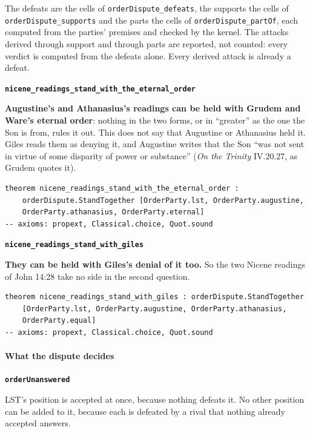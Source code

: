 \documentclass[11pt,paper=\testimonypaper,DIV=13,parskip=false]{scrartcl}
\begin{document}
\noindent The defeats are the cells of \texttt{order\allowbreak{}Dispute\_\allowbreak{}defeats}, the supports the cells of \texttt{order\allowbreak{}Dispute\_\allowbreak{}supports} and the parts the cells of \texttt{order\allowbreak{}Dispute\_\allowbreak{}part\allowbreak{}Of}, each computed from the parties' premises and checked by the kernel. The attacks derived through support and through parts are reported, not counted: every verdict is computed from the defeats alone. Every derived attack is already a defeat.
\par\medskip\noindent\textbf{\texttt{nicene\_\allowbreak{}readings\_\allowbreak{}stand\_\allowbreak{}with\_\allowbreak{}the\_\allowbreak{}eternal\_\allowbreak{}order}}\par\nobreak\noindent
\textbf{Augustine’s and Athanasius’s readings can be held with Grudem and Ware’s eternal order}: nothing in the two forms, or in “greater” as the one the Son is from, rules it out. This does not say that Augustine or Athanasius held it. Giles reads them as denying it, and Augustine writes that the Son “was not sent in virtue of some disparity of power or substance” (\emph{On the Trinity} IV.20.27, as Grudem quotes it).

{\small\begin{verbatim}
theorem nicene_readings_stand_with_the_eternal_order :
    orderDispute.StandTogether [OrderParty.lst, OrderParty.augustine,
    OrderParty.athanasius, OrderParty.eternal]
-- axioms: propext, Classical.choice, Quot.sound
\end{verbatim}}
\par\medskip\noindent\textbf{\texttt{nicene\_\allowbreak{}readings\_\allowbreak{}stand\_\allowbreak{}with\_\allowbreak{}giles}}\par\nobreak\noindent
\textbf{They can be held with Giles’s denial of it too.} So the two Nicene readings of John 14:28 take no side in the second question.

{\small\begin{verbatim}
theorem nicene_readings_stand_with_giles : orderDispute.StandTogether
    [OrderParty.lst, OrderParty.augustine, OrderParty.athanasius,
    OrderParty.equal]
-- axioms: propext, Classical.choice, Quot.sound
\end{verbatim}}
\paragraph*{What the dispute decides}
\leavevmode\par\nobreak
\par\medskip\noindent\textbf{\texttt{order\allowbreak{}Unanswered}}\par\nobreak\noindent
LST’s position is accepted at once, because nothing defeats it. No other position can be added to it, because each is defeated by a rival that nothing already accepted answers.
\end{document}
